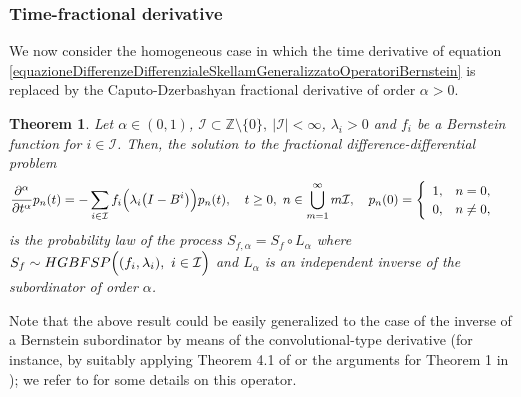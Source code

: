 \documentclass[12pt, twoside, english, headsepline]{article}
\newtheorem{theorem}{Theorem}[section] %
\theoremstyle{definition} %
\numberwithin{equation}{section} %
\begin{document}
\subsubsection{Time-fractional derivative}\label{sottosezioneSkellamFrazionarioNelTempo}

We now consider the homogeneous case in which the time derivative of equation \eqref{equazioneDifferenzeDifferenzialeSkellamGeneralizzatoOperatoriBernstein} is replaced by the Caputo-Dzerbashyan fractional derivative of order $\alpha >0$.

\begin{theorem}\label{teoremaSkellamBernsteinCaputo}
Let $\alpha\in(0,1)$, $\mathcal{I}\subset \mathbb{Z}\setminus\{0\}, \ |\mathcal{I}|<\infty$, $\lambda_i >0$ and $f_i$ be a Bernstein function for $i\in\mathcal{I}$. Then, the solution to the fractional difference-differential problem 
\begin{equation}\label{equazioneDifferenzeDifferenzialeSkellamGeneralizzatoOperatoriBernsteinCaputo}
  \frac{\partial^\alpha }{\partial t^\alpha} p_n(t)= -\sum_{i\in\mathcal{I}} f_i\Bigl( \lambda_i\big(I-B^i\big) \Bigr)p_n(t), \ \ \ t \ge0,\ n\in  \bigcup_{m=1}^\infty m\mathcal{I},\ \ \ p_n(0) =\begin{cases}\begin{array}{l l}1,& n=0,\\0,&n\not=0,\end{array}\end{cases} 
\end{equation}
is the probability law of the process $S_{f,\alpha} = S_f\circ L_\alpha$ where $S_f\sim HGBFSP\Bigl((f_i,\lambda_i),\ i\in\mathcal{I}\Bigr)$ and $L_\alpha$ is an independent inverse of the subordinator of order $\alpha$.
\end{theorem}

Note that the above result could be easily generalized to the case of the inverse of a Bernstein subordinator by means of the convolutional-type derivative (for instance, by suitably applying Theorem 4.1 of \cite{CO2026} or the arguments for Theorem 1 in \cite{BS2024}); we refer to \cite{K2011, T2015} for some details on this operator.
\end{document}
